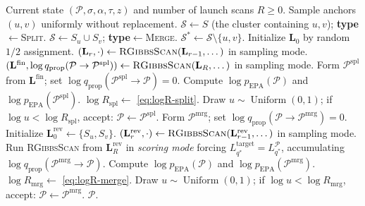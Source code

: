 \documentclass[11pt]{article}
\DeclareMathOperator{\EPA}{EPA}
\DeclareMathOperator{\Unif}{Uniform}
\begin{document}
\begin{algorithm}[H]
\caption{One split--merge MH step for EPA--LSIRM.}
\small
\begin{algorithmic}[1]
\Require Current state $(\mathcal{P},\sigma,\alpha,\tau,z)$ and number of
launch scans $R\geq 0$.
\State Sample anchors $(u,v)$ uniformly without replacement.
    \State $\mathcal{S}\gets S$ (the cluster containing $u,v$);
    \textbf{type}$\gets$\textsc{Split}.
\Else
    \State $\mathcal{S}\gets S_u\cup S_v$; \textbf{type}$\gets$\textsc{Merge}.
\EndIf
\State $\mathcal{S}^*\gets\mathcal{S}\setminus\{u,v\}$.
    \State Initialize $\mathbf{L}_0$ by random $1/2$ assignment.
        \State $(\mathbf{L}_r,\cdot)\gets\textsc{RGibbsScan}(\mathbf{L}_{r-1},\dots)$ in sampling mode.
    \EndFor
    \State $(\mathbf{L}^{\mathrm{fin}},\log q_{\mathrm{prop}}(\mathcal{P}\to\mathcal{P}^{\mathrm{spl}}))
            \gets\textsc{RGibbsScan}(\mathbf{L}_R,\dots)$ in sampling mode.
    \State Form $\mathcal{P}^{\mathrm{spl}}$ from $\mathbf{L}^{\mathrm{fin}}$;
    set $\log q_{\mathrm{prop}}(\mathcal{P}^{\mathrm{spl}}\to\mathcal{P})=0$.
    \State Compute $\log p_{\EPA}(\mathcal{P})$ and $\log p_{\EPA}(\mathcal{P}^{\mathrm{spl}})$.
    \State $\log R_{\mathrm{spl}}\gets$ \eqref{eq:logR-split}.
    \State Draw $u\sim\Unif(0,1)$; if $\log u<\log R_{\mathrm{spl}}$, accept:
    $\mathcal{P}\gets\mathcal{P}^{\mathrm{spl}}$.
\Else
    \State Form $\mathcal{P}^{\mathrm{mrg}}$;
    set $\log q_{\mathrm{prop}}(\mathcal{P}\to\mathcal{P}^{\mathrm{mrg}})=0$.
    \State Initialize $\mathbf{L}_0^{\mathrm{rev}}\gets\{S_u,S_v\}$.
        \State $(\mathbf{L}_r^{\mathrm{rev}},\cdot)\gets\textsc{RGibbsScan}(\mathbf{L}_{r-1}^{\mathrm{rev}},\dots)$ in sampling mode.
    \EndFor
    \State Run \textsc{RGibbsScan} from $\mathbf{L}_R^{\mathrm{rev}}$ in
    \emph{scoring mode} forcing $L_{q^*}^{\mathrm{target}}=L_{q^*}^{\mathcal{P}}$,
    accumulating $\log q_{\mathrm{prop}}(\mathcal{P}^{\mathrm{mrg}}\to\mathcal{P})$.
    \State Compute $\log p_{\EPA}(\mathcal{P})$ and $\log p_{\EPA}(\mathcal{P}^{\mathrm{mrg}})$.
    \State $\log R_{\mathrm{mrg}}\gets$ \eqref{eq:logR-merge}.
    \State Draw $u\sim\Unif(0,1)$; if $\log u<\log R_{\mathrm{mrg}}$, accept:
    $\mathcal{P}\gets\mathcal{P}^{\mathrm{mrg}}$.
\EndIf
\State \Return $\mathcal{P}$.
\end{algorithmic}
\end{algorithm}
\end{document}
